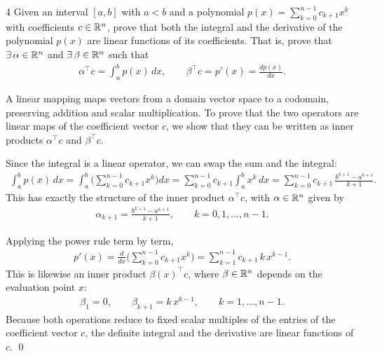 \documentclass[a4paper, 11pt]{article}
\begin{document}
\begin{problem}{4}
Given an interval $[a,b]$ with $a<b$ and a polynomial $p(x)=\sum_{k=0}^{n-1}c_{k+1}x^k$ with coefficients $c\in\mathbb{R}^n$, prove that both the integral and the derivative of the polynomial $p(x)$ are linear functions of its coefficients. That is, prove that $\exists\,\alpha\in\mathbb{R}^n$ and $\exists\,\beta\in\mathbb{R}^n$ such that
\begin{align*}
    \alpha^\top c = \int_a^b p(x)\,dx, \qquad \beta^\top c = p'(x) = \frac{dp(x)}{dx}.
\end{align*}
\end{problem}
\begin{solution}
A linear mapping maps vectors from a domain vector space to a codomain, preserving addition and scalar multiplication. To prove that the two operators are linear maps of the coefficient vector $c$, we show that they can be written as inner products $\alpha^\top c$ and $\beta^\top c$.

Since the integral is a linear operator, we can swap the sum and the integral:
\begin{align*}
    \int_a^b p(x)\,dx = \int_a^b\Big(\sum_{k=0}^{n-1}c_{k+1}x^k\Big)dx = \sum_{k=0}^{n-1}c_{k+1}\int_a^b x^k\,dx = \sum_{k=0}^{n-1}c_{k+1}\,\frac{b^{k+1}-a^{k+1}}{k+1}.
\end{align*}
This has exactly the structure of the inner product $\alpha^\top c$, with $\alpha\in\mathbb{R}^n$ given by
\begin{align*}
    \alpha_{k+1} = \frac{b^{k+1}-a^{k+1}}{k+1}, \qquad k=0,1,\dots,n-1.
\end{align*}

Applying the power rule term by term,
\begin{align*}
    p'(x) = \frac{d}{dx}\Big(\sum_{k=0}^{n-1}c_{k+1}x^k\Big) = \sum_{k=1}^{n-1}c_{k+1}\,k\,x^{k-1}.
\end{align*}
This is likewise an inner product $\beta(x)^\top c$, where $\beta\in\mathbb{R}^n$ depends on the evaluation point $x$:
\begin{align*}
    \beta_1 = 0, \qquad \beta_{k+1} = k\,x^{k-1}, \qquad k=1,\dots,n-1.
\end{align*}
Because both operations reduce to fixed scalar multiples of the entries of the coefficient vector $c$, the definite integral and the derivative are linear functions of $c$. \qed
\end{solution}
\problemend
\end{document}

